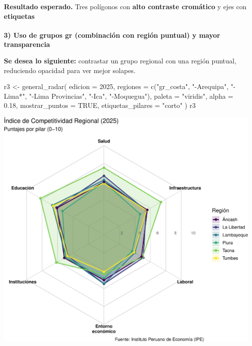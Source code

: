 \documentclass[
  11pt,
  letterpaper,
  DIV=11,
  numbers=noendperiod]{scrartcl}
\makeatletter
\let\oldparagraph\paragraph
\renewcommand{\paragraph}{
    \@ifstar
      \xxxParagraphStar
      \xxxParagraphNoStar
  }
\newcommand{\xxxParagraphStar}[1]{\oldparagraph*{#1}\mbox{}}
\newcommand{\xxxParagraphNoStar}[1]{\oldparagraph{#1}\mbox{}}
\newenvironment{Shaded}{\begin{snugshade}}{\end{snugshade}}
\newcommand{\AttributeTok}[1]{\textcolor[rgb]{0.40,0.45,0.13}{#1}}
\newcommand{\ConstantTok}[1]{\textcolor[rgb]{0.56,0.35,0.01}{#1}}
\newcommand{\DecValTok}[1]{\textcolor[rgb]{0.68,0.00,0.00}{#1}}
\newcommand{\FloatTok}[1]{\textcolor[rgb]{0.68,0.00,0.00}{#1}}
\newcommand{\FunctionTok}[1]{\textcolor[rgb]{0.28,0.35,0.67}{#1}}
\newcommand{\NormalTok}[1]{\textcolor[rgb]{0.00,0.23,0.31}{#1}}
\newcommand{\OtherTok}[1]{\textcolor[rgb]{0.00,0.23,0.31}{#1}}
\newcommand{\StringTok}[1]{\textcolor[rgb]{0.13,0.47,0.30}{#1}}
\makeatother
\begin{document}
\textbf{Resultado esperado.} Tres polígonos con \textbf{alto contraste
cromático} y ejes con \textbf{etiquetas}

\paragraph{\texorpdfstring{\textbf{3) Uso de grupos gr (combinación con
región puntual) y mayor
transparencia}}{3) Uso de grupos gr (combinación con región puntual) y mayor transparencia}}\label{uso-de-grupos-gr-combinaciuxf3n-con-regiuxf3n-puntual-y-mayor-transparencia}

\textbf{Se desea lo siguiente:} contrastar un grupo regional con una
región puntual, reduciendo opacidad para ver mejor solapes.

\begin{Shaded}
\begin{Highlighting}[]
\NormalTok{r3 }\OtherTok{\textless{}{-}} \FunctionTok{general\_radar}\NormalTok{(}
  \AttributeTok{edicion  =} \DecValTok{2025}\NormalTok{,}
  \AttributeTok{regiones =} \FunctionTok{c}\NormalTok{(}\StringTok{"gr\_costa"}\NormalTok{, }\StringTok{"{-}Arequipa"}\NormalTok{, }\StringTok{"{-}Lima*"}\NormalTok{, }
               \StringTok{"{-}Lima Provincias"}\NormalTok{, }\StringTok{"{-}Ica"}\NormalTok{, }\StringTok{"{-}Moquegua"}\NormalTok{),}
  \AttributeTok{paleta   =} \StringTok{"viridis"}\NormalTok{,}
  \AttributeTok{alpha    =} \FloatTok{0.18}\NormalTok{,}
  \AttributeTok{mostrar\_puntos    =} \ConstantTok{TRUE}\NormalTok{,}
  \AttributeTok{etiquetas\_pilares =} \StringTok{"corto"}
\NormalTok{)}
\NormalTok{r3}
\end{Highlighting}
\end{Shaded}

\includegraphics{Manual_files/figure-pdf/unnamed-chunk-54-1.pdf}
\end{document}
